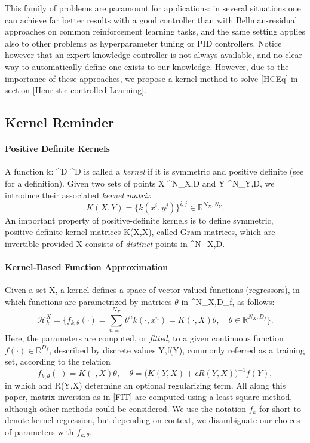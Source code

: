 \documentclass[
]{article}
\def\({}%
\def\){}%
\numberwithin{equation}{section}
\newcommand \RR    {\mathbb{R}}
\begin{document}
This family of problems are paramount for applications: in several situations one can achieve far better results with a good controller than with Bellman-residual approaches on common reinforcement learning tasks, and the same setting applies also to other problems as hyperparameter tuning or PID controllers. Notice however that an expert-knowledge controller is not always available, and no clear way to automatically define one exists to our knowledge. However, due to the importance of these approaches, we propose a kernel method to solve \eqref{HCEq} in section \ref{Heuristic-controlled Learning}.

\hypertarget{Kernel Reminder}{%
\subsection{Kernel Reminder}\label{Kernel Reminder}}
\paragraph*{Positive Definite Kernels} A function \(k: \RR^D \times \RR^D \mapsto {}\) is
called a \textit{kernel} if it is symmetric and positive definite (see
\cite{BTA} for a definition). Given two sets of points
\(X \in \RR^{N_X,D}\) and \(Y \in \RR^{N_Y,D}\), we introduce their
associated \textit{kernel matrix} \begin{equation}
K(X,Y)= \big\{k(x^i,y^j)\big\}^{i,j} \in \mathbb{R}^{N_X,N_Y}.
\end{equation} 
An important property of positive-definite kernels is to define symmetric, positive-definite kernel matrices \(K(X,X)\), called Gram matrices, which are invertible
provided \(X\) consists of \textit{distinct} points in \(\RR^{N_X,D}\).

\paragraph*{Kernel-Based Function Approximation}
Given a set \(X\), a kernel defines a space of vector-valued functions (regressors), in which functions are parametrized by
matrices $\theta$ in \(^{N_X,D_f}\), as follows: 
\begin{equation}
\label{Hk}
\mathcal{H}_k^X = \Big\{f_{k,\theta}(\cdot) = \sum_{n=1}^{N_X} \theta^n k(\cdot,x^n) = K(\cdot,X) \theta, \quad \theta \in \mathbb{R}^{N_X,D_f} \Big\}.
\end{equation} Here, the parameters \(\theta\) are computed,
or \textit{fitted}, to a given continuous function $f(\cdot) \in \mathbb{R}^{D_f}$, described by discrete values \(Y,f(Y)\), commonly referred as a training set, according to the relation
\begin{equation}\label{FIT}
 f_{k, \theta} (\cdot) = K(\cdot,X) \theta, \quad \theta = \Big( K(Y,X) + \epsilon R(Y,X) \Big)^{-1} f(Y),
\end{equation} in which \(\epsilon {}\) and \(R(Y,X)\) determine an
optional regularizing term. All along this paper, matrix inversion as in \eqref{FIT}  are computed using a least-square method, although other methods could be considered. We use the notation $f_{k}$ for short to denote kernel regression, but depending on context, we disambiguate our choices of parameters with $f_{k, \theta}$. 
\end{document}
